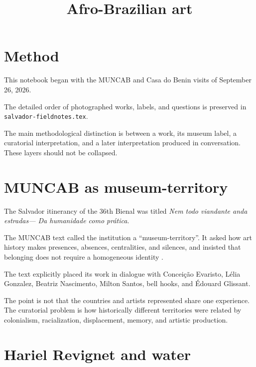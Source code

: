



\title{Afro-Brazilian art}
\maketitle

\label{section-phantom}

\tableofcontents

\section{Method}
\label{section-afro-art-method}

This notebook began with the MUNCAB and
Casa do Benin visits of September 26,
2026.

The detailed order of photographed works,
labels, and questions is preserved in
\texttt{salvador-fieldnotes.tex}.

The main methodological distinction is
between a work, its museum label, a
curatorial interpretation, and a later
interpretation produced in conversation.
These layers should not be collapsed.

\section{MUNCAB as museum-territory}
\label{section-muncab-territory}

The Salvador itinerancy of the 36th Bienal
was titled
\emph{Nem todo viandante anda estradas---
Da humanidade como pr\'atica}.

The MUNCAB text called the institution a
``museum-territory''.  It asked how art
history makes presences, absences,
centralities, and silences, and insisted
that belonging does not require a
homogeneous identity
\cite{muncab2026bienal}.

The text explicitly placed its work in
dialogue with Concei\c{c}\~ao Evaristo,
L\'elia Gonzalez, Beatriz Nascimento,
Milton Santos, bell hooks, and
\'Edouard Glissant.

The point is not that the countries and
artists represented share one experience.
The curatorial problem is how historically
different territories were related by
colonialism, racialization, displacement,
memory, and artistic production.

\section{Hariel Revignet and water}
\label{section-hariel-water}

